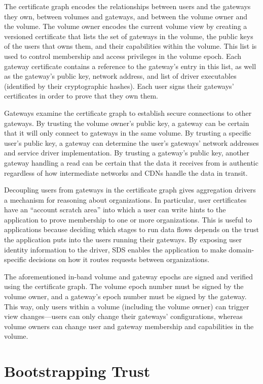 The certificate graph encodes the relationships between users and the gateways
they own, between volumes and gateways, and between the volume owner and the volume.
The volume owner encodes the current volume view by creating a versioned certificate that lists the set of gateways
in the volume, the public keys of the users that owns them, and their capabilities within the
volume.  This list is used to control membership and access
privileges in the volume epoch.  Each gateway certificate contains a reference to the gateway's
entry in this list, as well as the gateway's public key, network address, and list of
driver executables (identified by their cryptographic hashes).  Each user signs
their gateways' certificates in order to prove that they own them.

Gateways examine the certificate graph to establish secure connections to other
gateways.  By trusting the volume owner's public key, a gateway can be certain that it will
only connect to gateways in the same volume.  By trusting a specific user's
public key, a gateway can determine the user's gateways' network addresses and
service driver implementation.  By trusting a gateway's public key, another gateway
handling a read can be certain that the data it receives from is authentic regardless of how
intermediate networks and CDNs handle the data in transit.

Decoupling users from gateways in the certificate graph gives aggregation
drivers a mechanism for reasoning about organizations.  In particular, user
certificates have an ``account scratch area'' into which a user can write hints to the
application to prove membership to one or more organizations.  This is useful
to applications because deciding which
stages to run data flows depends on the trust the application
puts into the users running their gateways.  By exposing user identity
information to the driver, SDS enables the application to make domain-specific
decisions on how it routes requests between organizations.

The aforementioned in-band volume and gateway epochs are signed and
verified using the certificate graph.  The volume epoch number must be signed by
the volume owner, and a gateway's epoch number must be signed by the gateway.
This way, only users within a volume (including the volume owner) can trigger
view changes---users can only change their gateways' configurations, whereas volume
owners can change user and gateway membership and capabilities in the volume.

\section{Bootstrapping Trust}
\label{sec:bootstrapping-trust}

